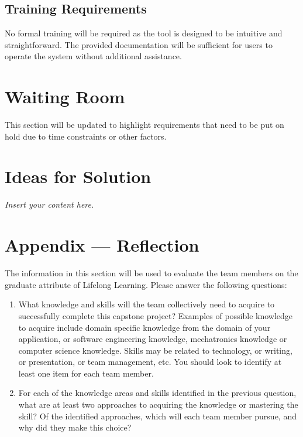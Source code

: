 \documentclass[12pt]{article}
\newcommand{\lips}{\textit{Insert your content here.}}
\begin{document}
\subsection{Training Requirements}
No formal training will be required as the tool is designed to be intuitive and
straightforward. The provided documentation will be sufficient for users to
operate the system without additional assistance.

\section{Waiting Room}
This section will be updated to highlight requirements that need to be put on
hold due to time constraints or other factors.

\section{Ideas for Solution}
\lips

\newpage{}
\section*{Appendix --- Reflection}

The information in this section will be used to evaluate the team members on the
graduate attribute of Lifelong Learning.  Please answer the following questions:

\begin{enumerate}
  \item What knowledge and skills will the team collectively need to acquire to
  successfully complete this capstone project?  Examples of possible knowledge
  to acquire include domain specific knowledge from the domain of your
  application, or software engineering knowledge, mechatronics knowledge or
  computer science knowledge.  Skills may be related to technology, or writing,
  or presentation, or team management, etc.  You should look to identify at
  least one item for each team member.
  \item For each of the knowledge areas and skills identified in the previous
  question, what are at least two approaches to acquiring the knowledge or
  mastering the skill?  Of the identified approaches, which will each team
  member pursue, and why did they make this choice?
\end{enumerate}
\end{document}
